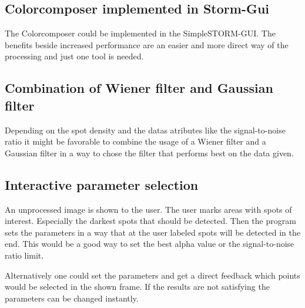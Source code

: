\subsection{Colorcomposer implemented in Storm-Gui}
The Colorcomposer could be implemented in the SimpleSTORM-GUI. The benefits beside increased performance are an easier and more direct way of the processing and just one tool is needed.
\subsection{Combination of Wiener filter and Gaussian filter}
Depending on the spot density and the datas atributes like the signal-to-noise ratio it might be favorable to combine the usage of a Wiener filter and a Gaussian filter in a way to chose the filter that performs best on the data given.
\subsection{Interactive parameter selection}
An unprocessed image is shown to the user. The user marks areas with spots of interest. Especially the darkest spots that should be detected. Then the program sets the parameters in a way that at the user labeled spots will be detected in the end. This would be a good way to set the best alpha value or the signal-to-noise ratio limit.\newline

Alternatively one could set the parameters and get a direct feedback which points would be selected in the shown frame. If the results are not satisfying the parameters can be changed instantly.